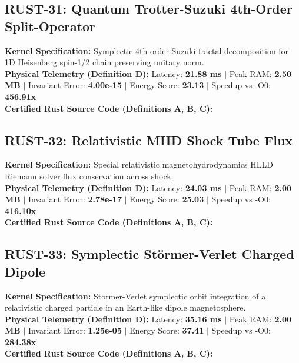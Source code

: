 \vspace{1em}
\subsection{RUST-31: Quantum Trotter-Suzuki 4th-Order Split-Operator}
\textbf{Kernel Specification:} Symplectic 4th-order Suzuki fractal decomposition for 1D Heisenberg spin-1/2 chain preserving unitary norm.\\
\textbf{Physical Telemetry (Definition D):} Latency: \textbf{21.88 ms} $|$ Peak RAM: \textbf{2.50 MB} $|$ Invariant Error: \textbf{4.00e-15} $|$ Energy Score: \textbf{23.13} $|$ Speedup vs -O0: \textbf{456.91x}\\

\textbf{Certified Rust Source Code (Definitions A, B, C):}


\vspace{1em}
\subsection{RUST-32: Relativistic MHD Shock Tube Flux}
\textbf{Kernel Specification:} Special relativistic magnetohydrodynamics HLLD Riemann solver flux conservation across shock.\\
\textbf{Physical Telemetry (Definition D):} Latency: \textbf{24.03 ms} $|$ Peak RAM: \textbf{2.00 MB} $|$ Invariant Error: \textbf{2.78e-17} $|$ Energy Score: \textbf{25.03} $|$ Speedup vs -O0: \textbf{416.10x}\\

\textbf{Certified Rust Source Code (Definitions A, B, C):}


\vspace{1em}
\subsection{RUST-33: Symplectic Störmer-Verlet Charged Dipole}
\textbf{Kernel Specification:} Stormer-Verlet symplectic orbit integration of a relativistic charged particle in an Earth-like dipole magnetosphere.\\
\textbf{Physical Telemetry (Definition D):} Latency: \textbf{35.16 ms} $|$ Peak RAM: \textbf{2.00 MB} $|$ Invariant Error: \textbf{1.25e-05} $|$ Energy Score: \textbf{37.41} $|$ Speedup vs -O0: \textbf{284.38x}\\

\textbf{Certified Rust Source Code (Definitions A, B, C):}



